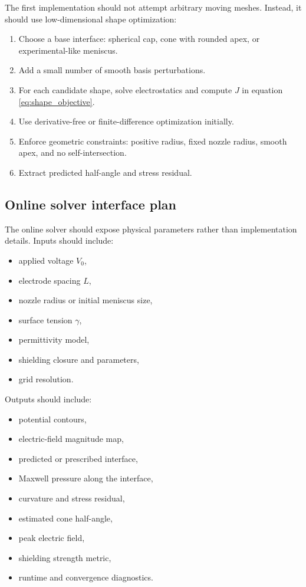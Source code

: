 \documentclass[11pt]{article}
\begin{document}
The first implementation should not attempt arbitrary moving meshes. Instead, it should use low-dimensional shape optimization:
\begin{enumerate}[label=\arabic*.]
    \item Choose a base interface: spherical cap, cone with rounded apex, or experimental-like meniscus.
    \item Add a small number of smooth basis perturbations.
    \item For each candidate shape, solve electrostatics and compute \(J\) in equation \eqref{eq:shape_objective}.
    \item Use derivative-free or finite-difference optimization initially.
    \item Enforce geometric constraints: positive radius, fixed nozzle radius, smooth apex, and no self-intersection.
    \item Extract predicted half-angle and stress residual.
\end{enumerate}

\subsection{Online solver interface plan}

The online solver should expose physical parameters rather than implementation details. Inputs should include:
\begin{itemize}
    \item applied voltage \(V_0\),
    \item electrode spacing \(L\),
    \item nozzle radius or initial meniscus size,
    \item surface tension \(\gamma\),
    \item permittivity model,
    \item shielding closure and parameters,
    \item grid resolution.
\end{itemize}
Outputs should include:
\begin{itemize}
    \item potential contours,
    \item electric-field magnitude map,
    \item predicted or prescribed interface,
    \item Maxwell pressure along the interface,
    \item curvature and stress residual,
    \item estimated cone half-angle,
    \item peak electric field,
    \item shielding strength metric,
    \item runtime and convergence diagnostics.
\end{itemize}
\end{document}
